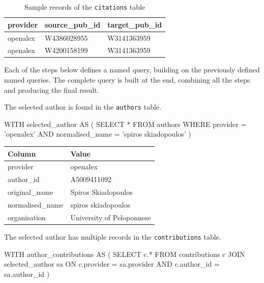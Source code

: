 \begin{table}[tb]
    \centering
    \begin{tabular}{|l|l|l|}
        \hline
        provider & source\_pub\_id & target\_pub\_id \\
        \hline\hline
        openalex & W4386028955 & W3141363959 \\
        openalex & W4200158199 & W3141363959 \\
        \hline
    \end{tabular}
    \caption{Sample records of the \texttt{citations} table}
    \label{tab:sample-citations}
\end{table}

Each of the steps below defines a named query, building on the previously defined named queries.
The complete query is built at the end, combining all the steps and producing the final result.

The selected author is found in the \texttt{authors} table.

\begin{SQLcode}
WITH selected_author AS (
    SELECT *
    FROM authors
    WHERE provider = 'openalex'
        AND normalised_name = 'spiros skiadopoulos'
)
\end{SQLcode}

\begin{center}
    \begin{tabular}{|l|l|}
        \hline
        Column & Value \\
        \hline\hline
        provider & openalex \\
        author\_id & A5009411092 \\
        original\_name & Spiros Skiadopoulos \\
        normalised\_name & spiros skiadopoulos \\
        organisation & University of Peloponnese \\
        \hline
    \end{tabular}
\end{center}

The selected author has multiple records in the \texttt{contributions} table.

\begin{SQLcode}
WITH author_contributions AS (
    SELECT c.*
    FROM contributions c
        JOIN selected_author sa
            ON c.provider = sa.provider
                AND c.author_id = sa.author_id
)
\end{SQLcode}

